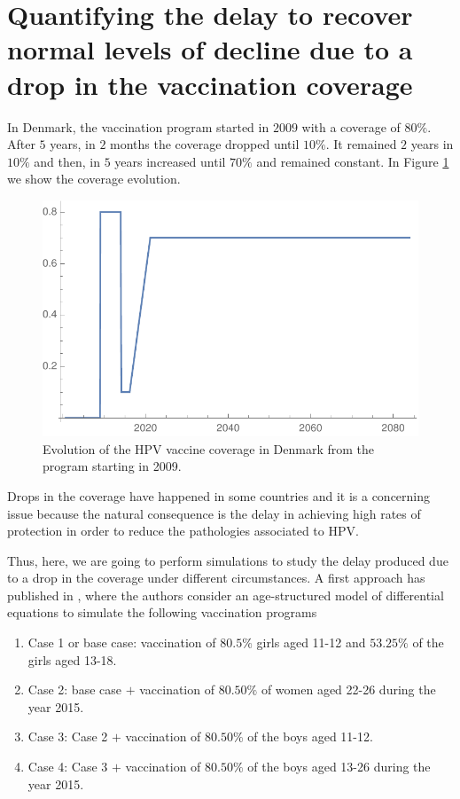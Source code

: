 \section{Quantifying the delay to recover normal levels of decline due to a drop in the vaccination coverage}\label{Resilence}
In Denmark, the vaccination program started in $2009$ with a coverage of $80\%$. After $5$ years, in $2$ months the coverage dropped until $10\%$. It remained $2$ years in $10\%$ and then, in $5$ years increased until $70\%$ and remained constant. In Figure \ref{fig:cobertura_danesa} we show the coverage evolution. 

\begin{figure}[h!]
	\centering
	\includegraphics[width=0.5\linewidth]{IMGs/11.-Resilencia/Cobertura_Danesa.pdf}
	\caption{Evolution of the HPV vaccine coverage in Denmark from the program starting in 2009.}
	\label{fig:cobertura_danesa}
\end{figure}

Drops in the coverage have happened in some countries and it is a concerning issue because the natural consequence is the delay in achieving high rates of protection in order to reduce the pathologies associated to HPV.

Thus, here, we are going to perform simulations to study the delay produced due to a drop in the coverage under different circumstances. A first approach has published in \cite{Elfstrm2015}, where the authors consider an age-structured model of differential equations \cite{Baussano2013} to simulate the following vaccination programs

\begin{enumerate}
	\item Case 1 or base case: vaccination of $80.5\%$ girls aged 11-12 and $53.25\%$ of the girls aged 13-18.
	\item Case 2: base case $+$ vaccination of $80.50\%$ of women aged 22-26 during the year 2015.
	\item Case 3: Case 2 $+$ vaccination of $80.50\%$ of the boys aged 11-12.
	\item Case 4: Case 3 $+$ vaccination of $80.50\%$ of the boys aged 13-26 during the year 2015.
\end{enumerate}

